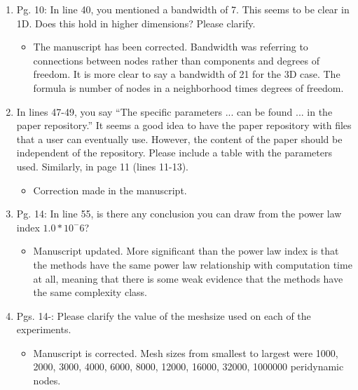 \documentclass{article}
\begin{document}
\begin{enumerate}
\item
Pg. 10: In line 40, you mentioned a bandwidth of 7. This seems to be clear in 1D.
Does this hold in higher dimensions? Please clarify.

{\color{red}  
\begin{itemize}
    \item
        The manuscript has been corrected. Bandwidth was referring to connections between nodes rather than components and degrees of freedom. It is more clear to say a bandwidth of 21 for the 3D case. The formula is number of nodes in a neighborhood times degrees of freedom.
  \end{itemize}}

    \item
        In lines 47-49, you say “The speciﬁc parameters ... can be found ... in the
        paper repository.” It seems a good idea to have the paper repository with ﬁles that a
        user can eventually use. However, the content of the paper should be independent
        of the repository. Please include a table with the parameters used. Similarly, in
        page 11 (lines 11-13).

{\color{red}  
\begin{itemize}
    \item
        Correction made in the manuscript. 
  \end{itemize}}

  \item
    Pg. 14: In line 55, is there any conclusion you can draw from the power law index
    $1.0 * 10^-6$?

{\color{red}  
\begin{itemize}
     \item
      Manuscript updated. More significant than the power law index is that the methods have the same power law relationship with computation time at all, meaning that there is some weak evidence that the methods have the same complexity class. 
  \end{itemize}}

  \item
    Pgs. 14-: Please clarify the value of the meshsize used on each of the experiments.

{\color{red}  
\begin{itemize}
     \item
         Manuscript is corrected. Mesh sizes from smallest to largest were 1000, 2000, 3000, 4000, 6000, 8000, 12000,
         16000, 32000, 1000000 peridynamic nodes.
      \end{itemize}}


\end{enumerate}
\end{document}
